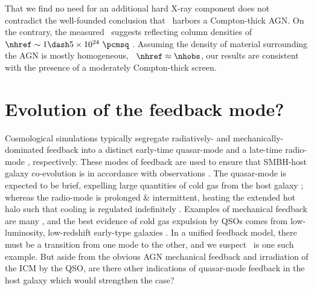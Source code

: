 \documentclass[useAMS,usenatbib]{mn2e}
\begin{document}
That we find no need for an additional hard X-ray component does not
contradict the well-founded conclusion that \irs\ harbors a
Compton-thick AGN. On the contrary, the measured \fekaew\ suggests
reflecting column densities of $\nhref \sim 1 \dash 5 \times 10^{24}
~\pcmsq$ \citep{1993MNRAS.263..314L, 2005A&A...444..119G,
  2010arXiv1005.3253C}. Assuming the density of material surrounding
the AGN is mostly homogeneous, \ie\ $\nhref \approx \nhobs$, our
results are consistent with the presence of a moderately Compton-thick
screen.

\section{Evolution of the feedback mode?}
\label{sec:bcg}

Cosmological simulations typically segregate radiatively- and
mechanically-dominated feedback into a distinct early-time quasar-mode
\citep[\eg][]{2005Natur.435..629S} and a late-time radio-mode
\citep[\eg][]{croton06}, respectively. These modes of feedback are
used to ensure that SMBH-host galaxy co-evolution is in accordance
with observations \citep[\eg][]{magorrian}. The quasar-mode is
expected to be brief, expelling large quantities of cold gas from the
host galaxy \citep{2006ApJ...642L.107N}; whereas the radio-mode is
prolonged \& intermittent, heating the extended hot halo such that
cooling is regulated indefinitely \citep[see][for a
  review]{mcnamrev}. Examples of mechanical feedback are many
\citep[\eg][]{perseus1, ms0735}, and the best evidence of cold gas
expulsion by QSOs comes from low-luminosity, low-redshift early-type
galaxies \citep[\eg][]{2009ApJ...690.1672S}. In a unified feedback
model, there must be a transition from one mode to the other, and we
suspect \irs\ is one such example. But aside from the obvious AGN
mechanical feedback and irradiation of the ICM by the QSO, are there
other indications of quasar-mode feedback in the host galaxy which
would strengthen the case?
\end{document}
